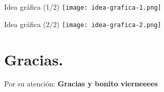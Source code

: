 \documentclass[11pt]{beamer}
\begin{document}
\begin{frame}{Idea gráfica (1/2)}
\centering
\texttt{[image: idea-grafica-1.png]} 
\end{frame}

\begin{frame}{Idea gráfica (2/2)}
\centering
\texttt{[image: idea-grafica-2.png]} 
\end{frame}

\section*{Gracias.}
\begin{frame} 
\tableofcontents[currentsection] %
\end{frame}

\begin{frame}{Por su atención:}
\centering
\Huge
\textbf{Gracias y bonito vierneeees}
\end{frame}
\end{document}
